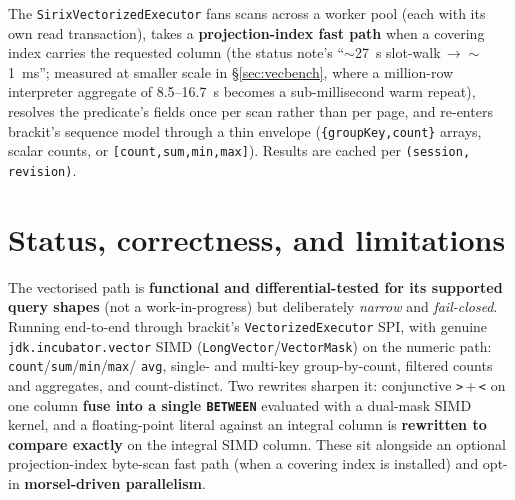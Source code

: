 \documentclass[11pt,a4paper,oneside]{report}
\theoremstyle{sirixthm}
\newcommand{\code}[1]{\texttt{#1}}
\begin{document}
\noindent The \code{SirixVectorizedExecutor} fans scans across a worker pool (each
with its own read transaction), takes a \textbf{projection-index fast path} when a covering
index carries the requested column (the status note's ``$\sim$27~s slot-walk\,$\to\sim$1~ms''; measured
at smaller scale in \S\ref{sec:vecbench}, where a million-row interpreter aggregate of 8.5--16.7~s becomes
a sub-millisecond warm repeat), resolves the predicate's fields once per scan rather than per page,
and re-enters brackit's sequence model through a thin envelope
(\code{\{groupKey,count\}} arrays, scalar counts, or \code{[count,sum,min,max]}).
Results are cached per \code{(session, revision)}.

\section{Status, correctness, and limitations}

The vectorised path is \textbf{functional and differential-tested for its supported query shapes}
(not a work-in-progress) but deliberately \emph{narrow} and \emph{fail-closed}. Running end-to-end
through brackit's \code{VectorizedExecutor} SPI, with genuine \code{jdk.incubator.vector} SIMD
(\code{LongVector}/\allowbreak\code{VectorMask}) on the numeric path: \code{count}/\allowbreak\code{sum}/\allowbreak\code{min}/\allowbreak\code{max}/%
\code{avg}, single- and multi-key group-by-count, filtered counts and aggregates, and count-distinct.
Two rewrites sharpen it: conjunctive \code{>}\,{+}\,\code{<} on one column \textbf{fuse into a single
\code{BETWEEN}} evaluated with a dual-mask SIMD kernel, and a floating-point literal against an integral
column is \textbf{rewritten to compare exactly} on the integral SIMD column. These sit alongside an optional
projection-index byte-scan fast path (when a covering index is installed) and opt-in
\textbf{morsel-driven parallelism}.
\end{document}
